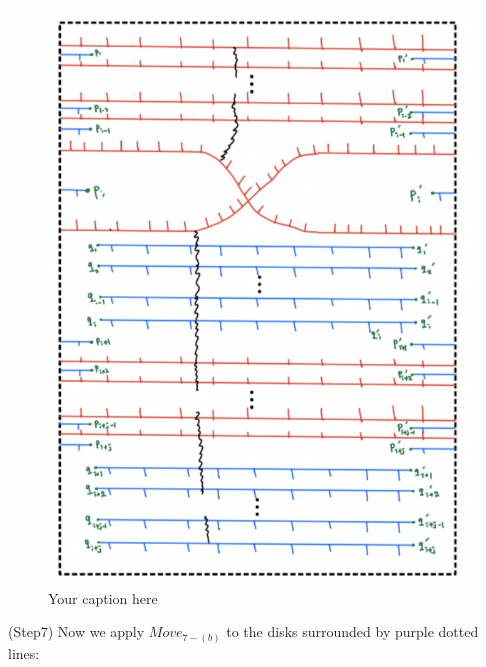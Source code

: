 \begin{figure}[H] %
    \centering
    \includegraphics[width=\linewidth]{diagrams/theorem12/14.png} %
    \caption{Your caption here}
    \label{fig:your-label}
\end{figure}

(Step7) Now we apply $Move_{7-(b)}$ to the disks surrounded by purple dotted lines:

